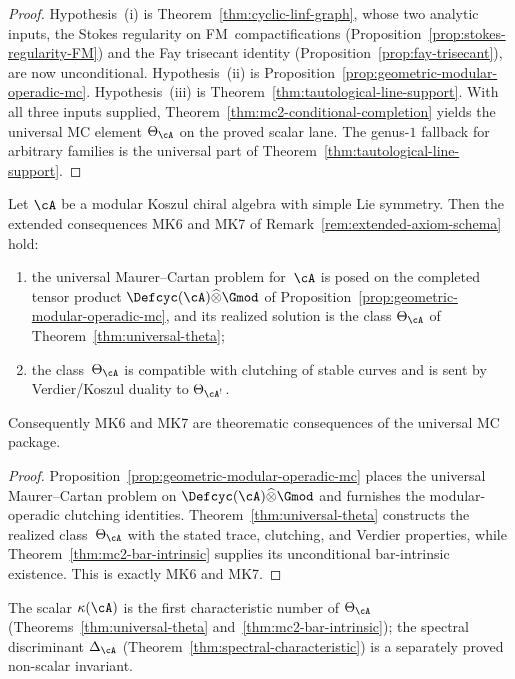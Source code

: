 \begin{proof}
Hypothesis~(i) is Theorem~\ref{thm:cyclic-linf-graph}, whose
two analytic inputs, the Stokes regularity on
FM~compactifications
(Proposition~\ref{prop:stokes-regularity-FM}) and the Fay
trisecant identity
(Proposition~\ref{prop:fay-trisecant}), are now
unconditional.  Hypothesis~(ii) is
Proposition~\ref{prop:geometric-modular-operadic-mc}.
Hypothesis~(iii) is
Theorem~\ref{thm:tautological-line-support}.
With all three inputs supplied,
Theorem~\ref{thm:mc2-conditional-completion} yields the
universal MC element $\Theta_{\cA}$ on the proved scalar lane.
The genus-$1$ fallback for arbitrary families is the universal part
of Theorem~\ref{thm:tautological-line-support}.
\end{proof}

\begin{lemma}
\label{lem:mk67-from-mc2}
Let $\cA$ be a modular Koszul chiral algebra with simple Lie
symmetry.  Then the extended consequences MK6 and MK7 of
Remark~\ref{rem:extended-axiom-schema} hold:
\begin{enumerate}[label=\textup{(\roman*)}]
\item the universal Maurer--Cartan problem for~$\cA$ is posed on the
  completed tensor product
  $\Defcyc(\cA)\widehat{\otimes}\Gmod$ of
  Proposition~\ref{prop:geometric-modular-operadic-mc}, and its
  realized solution is the class
  $\Theta_{\cA}$ of Theorem~\ref{thm:universal-theta};
\item the class~$\Theta_{\cA}$ is compatible with clutching of stable
  curves and is sent by Verdier/Koszul duality to
  $\Theta_{\cA^!}$.
\end{enumerate}
Consequently MK6 and MK7 are theorematic consequences of the
universal MC package.
\end{lemma}

\begin{proof}
Proposition~\ref{prop:geometric-modular-operadic-mc} places the
universal Maurer--Cartan problem on
$\Defcyc(\cA)\widehat{\otimes}\Gmod$ and furnishes the
modular-operadic clutching identities.  Theorem~\ref{thm:universal-theta}
constructs the realized class~$\Theta_{\cA}$ with the stated trace,
clutching, and Verdier properties, while
Theorem~\ref{thm:mc2-bar-intrinsic} supplies its unconditional
bar-intrinsic existence.  This is exactly MK6 and MK7.
\end{proof}

\begin{remark}
\label{rem:kappa-theta-relation}
The scalar $\kappa(\cA)$ is the first characteristic number of
$\Theta_{\cA}$ (Theorems~\ref{thm:universal-theta}
and~\ref{thm:mc2-bar-intrinsic}); the
spectral discriminant $\Delta_{\cA}$
(Theorem~\ref{thm:spectral-characteristic}) is a separately proved
non-scalar invariant.
\end{remark}

